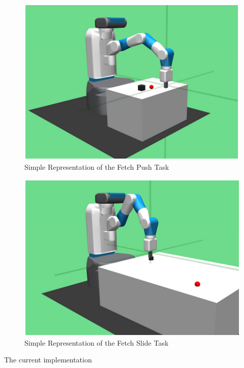 \begin{figure}[h!]
    \centering
    \includegraphics{images/FP.png}
    \caption{Simple Representation of the Fetch Push Task}
    \label{fig:FP}
\end{figure}

\begin{figure}[h!]
    \centering
    \includegraphics{images/FS.png}
    \caption{Simple Representation of the Fetch Slide Task}
    \label{fig:FS}
\end{figure}

The current implementation



